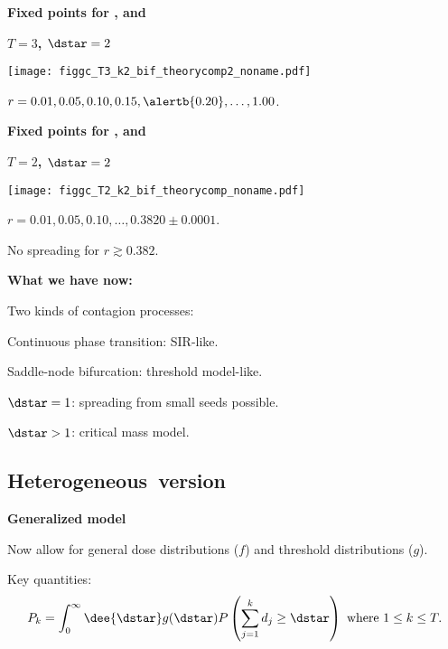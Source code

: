   \textbf{Fixed points for , and }

  \textbf{$T=3$, $\dstar=2$}
  \begin{center}
      \texttt{[image: figgc\_T3\_k2\_bif\_theorycomp2\_noname.pdf]}
      
       
        $r=0.01, 0.05, 0.10, 0.15, \alertb{0.20},\ldots, 1.00$.
      
  \end{center}
  


  \textbf{Fixed points for , and }

  \textbf{$T=2$, $\dstar=2$}
  \begin{center}
      \texttt{[image: figgc\_T2\_k2\_bif\_theorycomp\_noname.pdf]}
      
       
        $r=0.01, 0.05, 0.10,\ldots, 0.3820 \pm 0.0001$.
       
        No spreading for $r \gtrsim 0.382$.
      
  \end{center}
  


  \textbf{What we have now:}
  
  
   
    Two kinds of contagion processes:
    
     
      Continuous phase transition: \alert{SIR-like}.
     
      Saddle-node bifurcation: \alert{threshold model-like}.
    
  
    \alert{$\dstar=1$:} spreading from small seeds possible.
  
    \alert{$\dstar>1$:} critical mass model.
  
  


\subsection{Heterogeneous\ version}

  \textbf{Generalized model}

  
   
    Now allow for general dose distributions ($f$)
    and threshold distributions ($g$).
  
    Key quantities:
    $$
    P_k
    =
    \int_{0}^{\infty} \dee{\dstar}
    g(\dstar)
    P\left(
      \sum_{j=1}^{k} d_j \ge \dstar
    \right)
    \  \mbox{where} \  1 \le k \le T.
    $$
  
